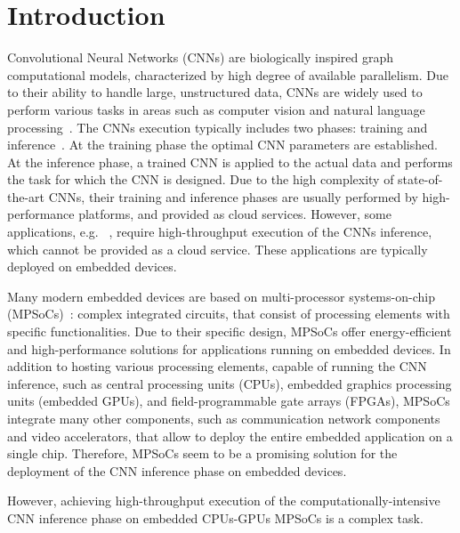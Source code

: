 \section{Introduction}
\label{sec:Intro}

Convolutional Neural Networks (CNNs) are biologically inspired graph computational models, characterized by high degree of available parallelism. Due to their ability to handle large, unstructured data, CNNs are widely used to perform various tasks in areas such as computer vision and natural language processing~\cite{Alom2018}. The CNNs execution typically includes two phases: training and  inference~\cite{Alom2018}. At the training phase the optimal CNN parameters are established. At the inference phase, a trained CNN is applied to the actual data and performs the task for which the CNN is designed. Due to the high complexity of state-of-the-art CNNs, their training and inference phases are usually performed by high-performance platforms, and provided as cloud services. However, some applications, e.g. ~\cite{MLInMedicineSecurity, MLInCars,MLinMedicine}, require high-throughput execution of the CNNs inference, which cannot be provided as a cloud service. These applications are typically deployed on embedded devices.

 
Many modern embedded devices are based on multi-processor systems-on-chip (MPSoCs)~\cite{Martin:DAC06}: complex integrated circuits, that consist of processing elements with specific functionalities.
Due to their specific design, MPSoCs offer energy-efficient and high-performance
solutions for applications running on embedded devices. In addition
to hosting various processing elements, capable of running the CNN
inference, such as central processing units (CPUs), embedded graphics
processing units (embedded GPUs), and field-programmable gate arrays
(FPGAs), MPSoCs integrate many other components, such as communication network 
components and video accelerators, that allow to deploy the entire embedded application on a single
chip. Therefore, MPSoCs seem to be a promising solution for the deployment
of the CNN inference phase on embedded devices. 

However, achieving high-throughput execution of the computationally-intensive CNN inference phase on embedded CPUs-GPUs MPSoCs is a complex task. 

